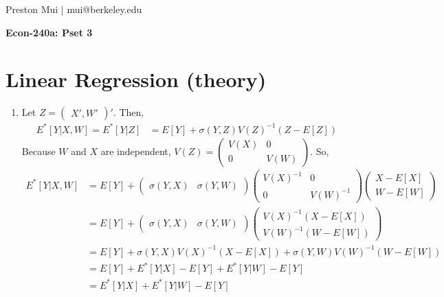\documentclass{article}[14pt]
\begin{document}
\begin{center}
	Preston Mui | mui@berkeley.edu

	{\bf Econ-240a: Pset 3}
\end{center}


\setcounter{section}{1}
\section{Linear Regression (theory)}
\begin{enumerate}

    \item Let $Z = \begin{pmatrix} X', W' \end{pmatrix}'$. Then, 
    \begin{align*}
        E^*[Y | X, W] = E^*[Y|Z] &= E[Y] + \sigma(Y,Z) V(Z)^{-1} (Z - E[Z])
    \end{align*}
    Because $W$ and $X$ are independent, $V(Z) = \begin{pmatrix} V(X) & 0 \\ 0 & V(W) \end{pmatrix}$. So, 
    \begin{align*}
        E^*[Y | X, W] &= E[Y] +
            \begin{pmatrix} \sigma(Y,X) & \sigma(Y,W) \end{pmatrix}
            \begin{pmatrix} V(X)^{-1} & 0 \\ 0 & V(W)^{-1} \end{pmatrix}
            \begin{pmatrix} X - E[X] \\ W - E[W] \end{pmatrix} \\
        &=  E[Y] + \begin{pmatrix} \sigma(Y,X) & \sigma(Y,W) \end{pmatrix}
            \begin{pmatrix} V(X)^{-1} (X - E[X]) \\ V(W)^{-1} (W - E[W]) \end{pmatrix} \\
        &=  E[Y] + \sigma(Y,X) V(X)^{-1}(X - E[X]) + \sigma(Y,W) V(W)^{-1} (W - E[W])\\
        &= E[Y] + E^*[Y|X] - E[Y] + E^*[Y|W] - E[Y] \\
        &= E^*[Y|X] + E^*[Y|W] - E[Y]
    \end{align*}


\end{enumerate}
\end{document}
